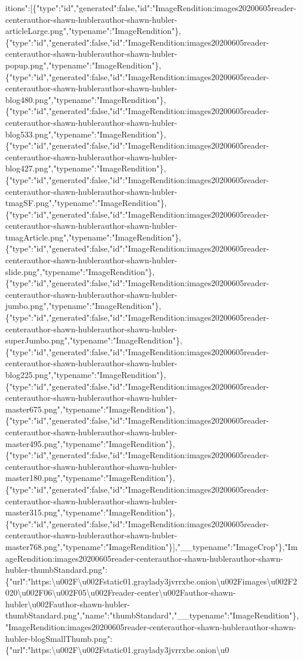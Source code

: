 itions":{[}\{"type":"id","generated":false,"id":"ImageRendition:images20200605reader-centerauthor-shawn-hublerauthor-shawn-hubler-articleLarge.png","typename":"ImageRendition"\},\{"type":"id","generated":false,"id":"ImageRendition:images20200605reader-centerauthor-shawn-hublerauthor-shawn-hubler-popup.png","typename":"ImageRendition"\},\{"type":"id","generated":false,"id":"ImageRendition:images20200605reader-centerauthor-shawn-hublerauthor-shawn-hubler-blog480.png","typename":"ImageRendition"\},\{"type":"id","generated":false,"id":"ImageRendition:images20200605reader-centerauthor-shawn-hublerauthor-shawn-hubler-blog533.png","typename":"ImageRendition"\},\{"type":"id","generated":false,"id":"ImageRendition:images20200605reader-centerauthor-shawn-hublerauthor-shawn-hubler-blog427.png","typename":"ImageRendition"\},\{"type":"id","generated":false,"id":"ImageRendition:images20200605reader-centerauthor-shawn-hublerauthor-shawn-hubler-tmagSF.png","typename":"ImageRendition"\},\{"type":"id","generated":false,"id":"ImageRendition:images20200605reader-centerauthor-shawn-hublerauthor-shawn-hubler-tmagArticle.png","typename":"ImageRendition"\},\{"type":"id","generated":false,"id":"ImageRendition:images20200605reader-centerauthor-shawn-hublerauthor-shawn-hubler-slide.png","typename":"ImageRendition"\},\{"type":"id","generated":false,"id":"ImageRendition:images20200605reader-centerauthor-shawn-hublerauthor-shawn-hubler-jumbo.png","typename":"ImageRendition"\},\{"type":"id","generated":false,"id":"ImageRendition:images20200605reader-centerauthor-shawn-hublerauthor-shawn-hubler-superJumbo.png","typename":"ImageRendition"\},\{"type":"id","generated":false,"id":"ImageRendition:images20200605reader-centerauthor-shawn-hublerauthor-shawn-hubler-blog225.png","typename":"ImageRendition"\},\{"type":"id","generated":false,"id":"ImageRendition:images20200605reader-centerauthor-shawn-hublerauthor-shawn-hubler-master675.png","typename":"ImageRendition"\},\{"type":"id","generated":false,"id":"ImageRendition:images20200605reader-centerauthor-shawn-hublerauthor-shawn-hubler-master495.png","typename":"ImageRendition"\},\{"type":"id","generated":false,"id":"ImageRendition:images20200605reader-centerauthor-shawn-hublerauthor-shawn-hubler-master180.png","typename":"ImageRendition"\},\{"type":"id","generated":false,"id":"ImageRendition:images20200605reader-centerauthor-shawn-hublerauthor-shawn-hubler-master315.png","typename":"ImageRendition"\},\{"type":"id","generated":false,"id":"ImageRendition:images20200605reader-centerauthor-shawn-hublerauthor-shawn-hubler-master768.png","typename":"ImageRendition"\}{]},"\_\_typename":"ImageCrop"\},"ImageRendition:images20200605reader-centerauthor-shawn-hublerauthor-shawn-hubler-thumbStandard.png":\{"url":"https:\textbackslash{}u002F\textbackslash{}u002Fstatic01.graylady3jvrrxbe.onion\textbackslash{}u002Fimages\textbackslash{}u002F2020\textbackslash{}u002F06\textbackslash{}u002F05\textbackslash{}u002Freader-center\textbackslash{}u002Fauthor-shawn-hubler\textbackslash{}u002Fauthor-shawn-hubler-thumbStandard.png","name":"thumbStandard","\_\_typename":"ImageRendition"\},"ImageRendition:images20200605reader-centerauthor-shawn-hublerauthor-shawn-hubler-blogSmallThumb.png":\{"url":"https:\textbackslash{}u002F\textbackslash{}u002Fstatic01.graylady3jvrrxbe.onion\textbackslash{}u0